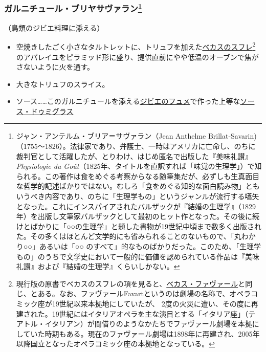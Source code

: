 \begin{recette}
{\subsubsection[ガルニチュール・ブリヤサヴァラン]{\texorpdfstring{ガルニチュール・ブリヤサヴァラン\footnote{ジャン・アンテルム・ブリア＝サヴァラン（Jean
  Anthelme
  Brillat-Savarin)（1755〜1826）。法律家であり、弁護士、一時はアメリカに亡命し、のちに裁判官として活躍したが、とりわけ、はじめ匿名で出版した『美味礼讃』\emph{Physiologie
  du
  Goût}（1825年、タイトルを直訳すれば「味覚の生理学」）で知られる。この著作は食をめぐる考察からなる随筆集だが、必ずしも生真面目な哲学的記述ばかりではない。むしろ「食をめぐる知的な面白読み物」ともいうべき内容であり、のちに「生理学もの」というジャンルが流行する嚆矢となった。これにインスパイアされたバルザックが『結婚の生理学』（1829年）を出版し文筆家バルザックとして最初のヒット作となった。その後に続けとばかりに「○○の生理学」と題した書物が19世紀中頃まで数多く出版された。その多くはほとんど文学的にも省みられることのないもので、「丸わかり○○」あるいは「○○
  のすべて」的なものばかりだった。このため、「生理学もの」のうちで文学史において一般的に価値を認められている作品は『美味礼讃』および『結婚の生理学』くらいしかない。}}{ガルニチュール・ブリヤサヴァラン}}\label{garniture-brillat-savarin}}



（鳥類のジビエ料理に添える）

\begin{itemize}
\item
  空焼きしたごく小さなタルトレットに、トリュフを加えた\protect\hyperlink{souffle-de-becasse}{ベカスのスフレ}\footnote{現行版の原書でベカスのスフレの項を見ると、\protect\hyperlink{becasse-favart}{ベカス・ファヴァール}と同じ、とある。なお、ファヴァールFavartというのは劇場の名称で、オペラコミック座が19世紀以来本拠地にしていたが、
    2度の火災に遭い、その度に再建された。19世紀にはイタリアオペラを主な演目とする「イタリア座」（テアトル・イタリアン）が間借りのようなかたちでファヴァール劇場を本拠にしていた時期もある。現在のファヴァール劇場は1898年に再建され、2005年以降国立となったオペラコミック座の本拠地となっている。}のアパレイユをピラミッド形に盛り、提供直前にやや低温のオーブンで焦がさないように火を通す。
\item
  大きなトリュフのスライス。
\item
  ソース\ldots{}\ldots{}このガルニチュールを添える\protect\hyperlink{fonds-de-gibier}{ジビエのフュメ}で作った上等な\protect\hyperlink{sauce-demi-glace}{ソース・ドゥミグラス}
\end{itemize}


\end{recette}
